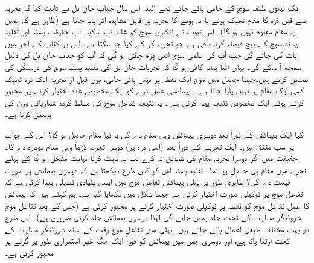     تک تینوں طبقہ سوچ کے حامی پائے جاتے تھے البتہ اس سال  جناب جان بل نے  ثابت کیا کہ تجربہ سے قبل   ذرہ کا مقام ٹھیک  ہونے یا   نہ  ہونے کا  تجربہ پر قابل مشاہدہ اثر پایا جاتا ہے (ظاہر ہے کہ ہمیں یہ مقام معلوم نہیں ہو گا)۔ اس ثبوت نے انکاری سوچ کو غلط ثابت کیا۔ اب حقیقت پسند اور تقلید پسند سوچ کے بیچ   فیصلہ کرنا باقی ہے جو تجربہ کر کے کیا جا سکتا ہے۔ اس پر کتاب کے آخر میں بات کی جائے گی جب آپ کی علمی سوچ اتنی بڑھ چکی ہو گی کہ آپ کو  جناب جان بل کی دلیل سمجھ آ سکے گی۔ یہاں اتنا بتانا کافی ہو گا کہ تجربات  جان بل کی تقلید پسند سوچ کی درستگی کی تصدیق کرتے ہیں۔جیسا جھیل میں  موج ایک نقطہ پر نہیں پائی جاتی،  یوں  قبل از تجربہ  ایک ذرہ ٹھیک کسی  ایک مقام پر  نہیں پایا جاتا ہے ۔  پیمائشی عمل ذرے کو ایک مخصوص عدد اختیار کرنے پر مجبور کرتے ہوئے  ایک مخصوص نتیجہ پیدا کرتی ہے ۔ یہ نتیجہ تفاعل موج کی مسلط کردہ شماریاتی وزن کی پابندی کرتا ہے۔

 کیا ایک پیمائش کے فوراً بعد دوسری پیمائش وہی مقام  دے گی یا نیا مقام حاصل ہو گا؟ اس کے جواب پر سب متفق ہیں۔ ایک تجربے کے فوراً  بعد (اسی ذرہ پر) دوسرا تجربہ لازماً وہی مقام دوبارہ دے گا۔  حقیقت میں اگر دوسرا تجربہ مقام  کی تصدیق نہ کرے تب یہ ثابت کرنا نہایت مشکل ہو گا کے پہلے تجربہ میں مقام  ہی حاصل ہوا تھا۔ تقلید پسند اس کو کس طرح دیکھتا ہے کہ دوسری پیمائش ہر صورت  قیمت دے گی؟ ظاہری طور پر پہلی پیمائش تفاعل موج میں  ایسی بنیادی تبدیلی پیدا کرتی ہے کہ تفاعل موج    پر نوکیلی صورت اختیار کرتی ہے  جیسا  شکل  میں دکھایا گیا ہے۔ ہم کہتے ہیں کہ پیمائش کا عمل تفاعل موج کو نقطہ  پر   نوکیلی صورت اختیار کرنے پر مجبور کرتی ہے  (جس کے بعد تفاعل موج شروڈنگر مساوات کے تحت جلد  پھیل جائے گی لہٰذا دوسری پیمائش جلد کرنی ضروری ہے)۔ اس طرح دو بہت مختلف طبعی اعمال پائے جاتے ہیں۔ پہلی میں  تفاعل موج وقت کے ساتھ شروڈنگر مساوات کے تحت ارتقا پاتا ہے، اور دوسری جس میں  پیمائش  کو فوراً ایک جگہ غیر استمراری طور پر گرنے پر مجبور کرتی ہے۔ 


